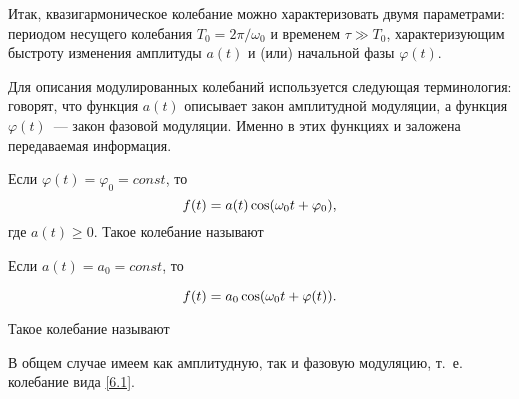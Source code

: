 Итак, квазигармоническое колебание можно характеризовать двумя параметрами: периодом несущего колебания
$T_0=2\pi/\omega_0$ и временем $\tau \gg T_0$, характеризующим быстроту изменения амплитуды $a(t)$ и (или) начальной
фазы $\varphi(t)$.

%
Для описания модулированных колебаний используется
следующая терминология: говорят, что функция $a(t)$ описывает закон амплитудной модуляции, а функция $\varphi(t)$~--- закон
фазовой модуляции. Именно в этих функциях и заложена передаваемая информация.

Если $\varphi(t)=\varphi_0=const$, то
\begin{equation}
	\eqmark{6.3}
	f(t)=a(t)\cos(\omega_0t+\varphi_0),
\end{equation}
где $a(t)\ge0$. Такое колебание называют 

Если $a(t)=a_0=const$, то

\begin{equation}
	\eqmark{6.4}
	f(t)=a_0 \cos(\omega_0t+\varphi(t)).
\end{equation}

Такое колебание называют 

В общем случае имеем как амплитудную, так и фазовую модуляцию, т.~е. колебание вида \eqref{6.1}.





